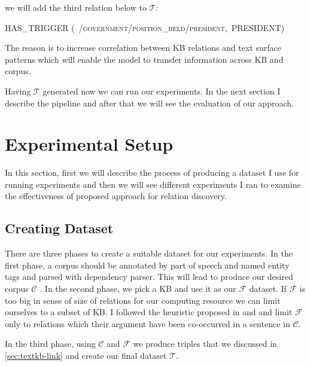 \begin {description}
 we will add the third relation below to $\mathcal{T}$:
  \begin{center}
 \textsc{HAS\_TRIGGER (~/government/position_held/president,~PRESIDENT)}
 \end{center}
 
 The reason is to increase correlation between KB relations and text surface
 patterns which will enable the model to transfer information across KB and
 corpus.
 \end{description}
 
 Having $\mathcal{T}$ generated now we can run our experiments. In the next
 section I describe the pipeline  and after that we will see the evaluation of
 our approach.

\section{Experimental Setup}
\label{sec:textkb-exp}

In this section, first we will describe the process of producing a dataset I use
for running experiments and then we will see different experiments I ran to
examine the effectiveness of proposed approach for relation discovery.

\subsection{Creating Dataset}
\label{ssec:textkb-exp-data}

There are three phases to create a suitable dataset for our experiments. In the
first phase, a corpus should be annotated by part of speech and named entity
tags and parsed with dependency parser. This will lead to produce our desired
corpus $\mathcal{C}$ . In the second phase, we pick a KB and
use it as our $\mathcal{F}$ dataset. If $\mathcal{F}$ is too big in sense of
size of relations for our computing resource we can limit ourselves to a subset
of KB. I followed the heuristic proposed in \cite{Mintz2009} and
\cite{Riedel2013} and limit  $\mathcal{F}$ only to relations which their
argument have been co-occurred in a sentence in $\mathcal{C}$.

In the third phase, using $\mathcal{C}$ and $\mathcal{F}$ we produce triples
that we discussed in \autoref{sec:textkb-link} and create our final dataset
$\mathcal{T}$. 

